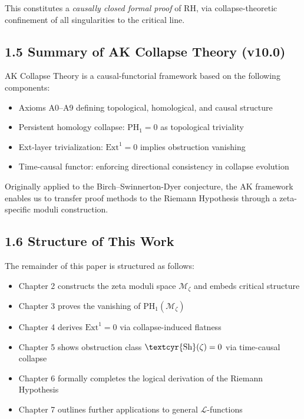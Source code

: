 \documentclass[11pt]{article}
\newcommand{\Sha}{\text{\textcyr{Sh}}}
\begin{document}
This constitutes a \emph{causally closed formal proof} of RH, via collapse-theoretic confinement of all singularities to the critical line.

\subsection{1.5 Summary of AK Collapse Theory (v10.0)}

AK Collapse Theory is a causal-functorial framework based on the following components:

\begin{itemize}
    \item Axioms A0–A9 defining topological, homological, and causal structure
    \item Persistent homology collapse: $\mathrm{PH}_1 = 0$ as topological triviality
    \item Ext-layer trivialization: $\mathrm{Ext}^1 = 0$ implies obstruction vanishing
    \item Time-causal functor: enforcing directional consistency in collapse evolution
\end{itemize}

Originally applied to the Birch–Swinnerton-Dyer conjecture, the AK framework enables us to transfer proof methods to the Riemann Hypothesis through a zeta-specific moduli construction.

\subsection{1.6 Structure of This Work}

The remainder of this paper is structured as follows:

\begin{itemize}
    \item Chapter 2 constructs the zeta moduli space $\mathcal{M}_\zeta$ and embeds critical structure
    \item Chapter 3 proves the vanishing of $\mathrm{PH}_1(\mathcal{M}_\zeta)$
    \item Chapter 4 derives $\mathrm{Ext}^1 = 0$ via collapse-induced flatness
    \item Chapter 5 shows obstruction class $\Sha(\zeta) = 0$ via time-causal collapse
    \item Chapter 6 formally completes the logical derivation of the Riemann Hypothesis
    \item Chapter 7 outlines further applications to general $\mathcal{L}$-functions
\end{itemize}
\end{document}
